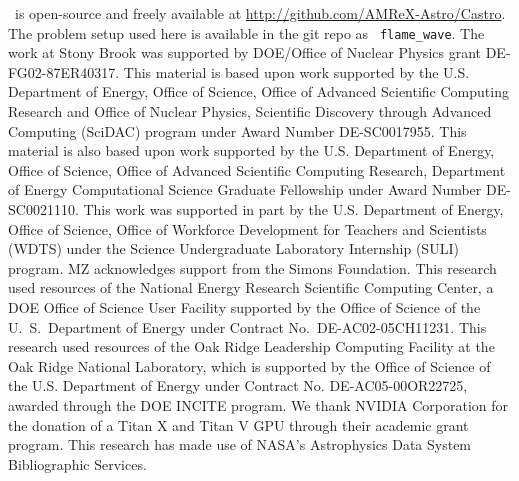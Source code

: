 \documentclass[preprint,times,tighten]{aastex63}
\newcommand{\castro}{{\sf Castro}}
\begin{document}



\acknowledgments \castro\ is open-source and freely available at
\url{http://github.com/AMReX-Astro/Castro}.  The problem setup used
here is available in the git repo as {\tt
  flame\_wave}.  The work at Stony Brook was supported by DOE/Office
of Nuclear Physics grant DE-FG02-87ER40317.  This material is based upon work supported by the
U.S. Department of Energy, Office of Science, Office of Advanced
Scientific Computing Research and Office of Nuclear Physics, Scientific
Discovery through Advanced Computing (SciDAC) program under Award
Number DE-SC0017955.  This material is also based upon work supported by the U.S. Department
of Energy, Office of Science, Office of Advanced Scientific Computing Research, Department of
Energy Computational Science Graduate Fellowship under Award Number DE-SC0021110. This work was supported in part by the U.S. Department of Energy, Office of Science, Office of Workforce Development for Teachers and Scientists (WDTS) under the Science Undergraduate Laboratory Internship (SULI) program. MZ acknowledges support from the Simons Foundation. 
This research used resources of the National Energy
Research Scientific Computing Center, a DOE Office of Science User
Facility supported by the Office of Science of the U.~S.\ Department
of Energy under Contract No.\ DE-AC02-05CH11231.  This research used
resources of the Oak Ridge Leadership Computing Facility at the Oak
Ridge National Laboratory, which is supported by the Office of Science
of the U.S. Department of Energy under Contract No. DE-AC05-00OR22725,
awarded through the DOE INCITE program.  We thank NVIDIA Corporation
for the donation of a Titan X and Titan V GPU through their academic
grant program.  This research has made use of NASA's Astrophysics Data
System Bibliographic Services.








\end{document}
